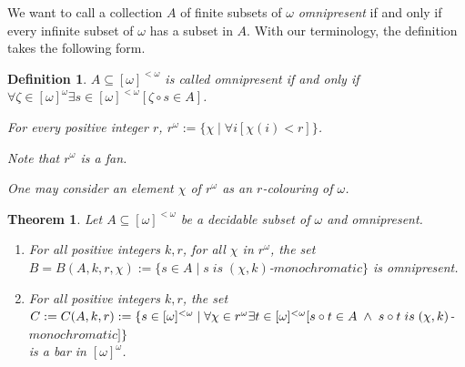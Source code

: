 \documentclass[a4paper]{amsart}
\theoremstyle{plain}
\newtheorem{theorem}{Theorem}
\newtheorem{definition}{Definition}
\begin{document}
	 
	 We want to call a collection $A$ of finite subsets of $\omega$ \emph{omnipresent} if and only if every infinite subset of $\omega$  has a subset in $A$.  With our terminology, the definition takes the following form.
	 
	 \begin{definition}\label{D:omnipresent} $A\subseteq [\omega]^{<\omega}$  is called \emph{ omnipresent} if and only if \\$\forall \zeta\in[\omega]^\omega\exists s \in [\omega]^{<\omega}[\zeta\circ s \in A]$. 
	 
	 \smallskip For every positive integer $r$, $r^\omega:=\{\chi\mid\forall i[\chi(i)<r]\}$. 
	 
	 \emph{Note that $r^\omega$ is a fan}. 
	 
	 \emph{One may consider an element $\chi$ of $r^\omega$ as an 
	 $r$-colouring of $\omega$}.  \end{definition}
	 \begin{theorem}\label{T:omnipresent} Let $A\subseteq [\omega]^{<\omega}$ be a decidable subset of $\omega$ and omnipresent. \begin{enumerate}[\upshape (i)] \item For all positive integers $k,r$, for all $\chi$ in $r^\omega$, the set \\ $B=B(A, k,r, \chi):=\{s\in A\mid s \;is\; (\chi, k)$-$monochromatic\}$ is omnipresent. \item For all positive integers $k,r$, the set $C:= C(A,k,r):=\\\{s \in [\omega]^{<\omega}\mid \forall \chi\in r^\omega\exists t\in [\omega]^{<\omega}[s\circ t \in A \;\wedge\;s\circ t\;is \;(\chi,k)$-$monochromatic ]\}$ \\is a bar in $[\omega]^\omega$. \end{enumerate} \end{theorem} 
	 
\end{document}
